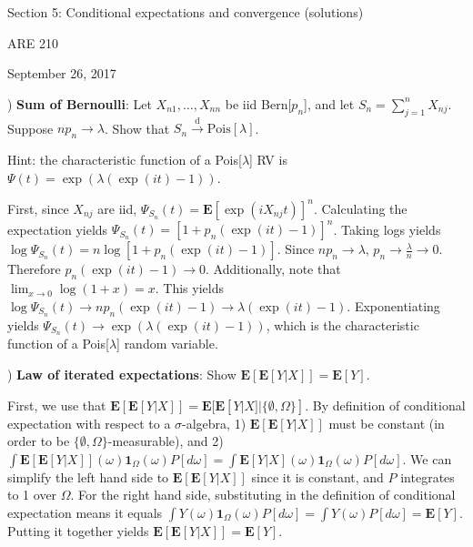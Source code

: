 \documentclass[12pt,english]{article}
\begin{document}
\begin{center}
{\Large{}Section 5: Conditional expectations and convergence (solutions)}
\par\end{center}{\Large \par}

\begin{center}
ARE 210
\par\end{center}

\begin{center}
September 26, 2017
\par\end{center}

) \textbf{Sum of Bernoulli}: Let $X_{n1}, \ldots, X_{nn}$ be iid Bern[$p_{n}$], and let $S_{n} = \sum_{j = 1}^{n} X_{nj}$. Suppose $np_{n} \to \lambda$. Show that $S_{n} \overset{\text{d}}{\to} \text{Pois}[\lambda]$.

Hint: the characteristic function of a Pois[$\lambda$] RV is $\Psi(t) = \exp(\lambda(\exp(it) - 1))$.
\vspace{1em}

First, since $X_{nj}$ are iid, $\Psi_{S_{n}}(t) = \mathbf{E}[\exp(i X_{nj} t)]^{n}$. Calculating the expectation yields $\Psi_{S_{n}}(t) = [1 + p_{n}(\exp(it) - 1)]^{n}$. Taking logs yields $\log \Psi_{S_{n}}(t) = n \log [1 + p_{n}(\exp(it) - 1)]$. Since $np_{n} \to \lambda$, $p_{n} \to \frac{\lambda}{n} \to 0$. Therefore $p_{n}(\exp(it) - 1) \to 0$. Additionally, note that $\lim_{x \to 0} \log (1 + x) = x$. This yields $\log \Psi_{S_{n}}(t) \to n p_{n}(\exp(it) - 1) \to \lambda (\exp(it) - 1)$. Exponentiating yields $\Psi_{S_{n}}(t) \to \exp(\lambda (\exp(it) - 1))$, which is the characteristic function of a Pois[$\lambda$] random variable.

\vspace{1em}
) \textbf{Law of iterated expectations}: Show $\mathbf{E}[\mathbf{E}[Y | X]] = \mathbf{E}[Y]$.
\vspace{1em}

First, we use that $\mathbf{E}[\mathbf{E}[Y | X]] = \mathbf{E}[\mathbf{E}[Y | X] | \{ \emptyset, \Omega \}]$. By definition of conditional expectation with respect to a $\sigma$-algebra, 1) $\mathbf{E}[\mathbf{E}[Y | X]]$ must be constant (in order to be $\{ \emptyset, \Omega \}$-measurable), and 2) $\int \mathbf{E}[\mathbf{E}[Y | X]](\omega) \mathbf{1}_{\Omega}(\omega) P[d\omega] = \int \mathbf{E}[Y | X](\omega) \mathbf{1}_{\Omega}(\omega) P[d\omega]$. We can simplify the left hand side to $\mathbf{E}[\mathbf{E}[Y | X]]$ since it is constant, and $P$ integrates to 1 over $\Omega$. For the right hand side, substituting in the definition of conditional expectation means it equals $\int Y(\omega) \mathbf{1}_{\Omega}(\omega) P[d\omega] = \int Y(\omega) P[d\omega] = \mathbf{E}[Y]$. Putting it together yields $\mathbf{E}[\mathbf{E}[Y | X]] = \mathbf{E}[Y]$.
\end{document}
